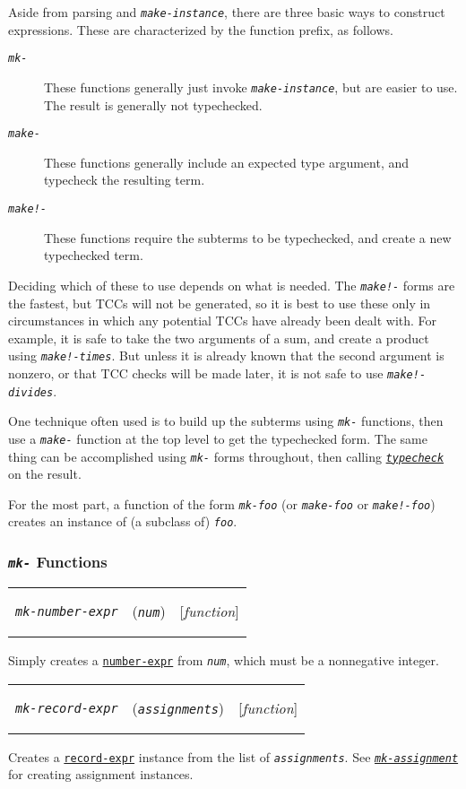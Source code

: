\documentclass[12pt]{book}
\makeatletter
\newenvironment{function}[3]%
{\par\noindent\begin{boxedminipage}{\textwidth}%
 \par\noindent\begin{tabularx}{\linewidth}{l>{\raggedright}Xr}%
 \functionhtgt{#1}&(\texttt{\textit{#2}})&[\emph{#3}]%
 \end{tabularx}\par\flushright\begin{minipage}{.97\textwidth}}
{\end{minipage}\end{boxedminipage}}
\newcommand{\functionarg}[1]{\texttt{\textit{#1}}}
\newcommand{\functionnm}[1]{\texttt{\textit{#1}}}
\newcommand{\functionhln}[1]{\hyperlink{#1}{\functionnm{#1}}}
\newcommand{\functionhtgt}[1]{\hypertarget{#1}{\functionnm{#1}}\index{#1@\functionnm{#1}|underline}}
\newenvironment{lispfunction}[2]%
{\begin{function}{#1}{#2}{function}}{\end{function}}
\newcommand{\classnm}[1]{\texttt{\textup{#1}}}
\newcommand{\classhln}[1]{\hyperlink{#1}{\classnm{#1}}}
\makeatother
\begin{document}
Aside from parsing and \functionnm{make-instance}, there are three basic
ways to construct expressions.  These are characterized by the function
prefix, as follows.
\begin{description}
\item[\functionnm{mk-}] These functions generally just invoke
\functionnm{make-instance}, but are easier to use.  The result is generally
not typechecked.

\item[\functionnm{make-}] These functions generally include an expected type
argument, and typecheck the resulting term.

\item[\functionnm{make!-}] These functions require the subterms to be
typechecked, and create a new typechecked term.
\end{description}

Deciding which of these to use depends on what is needed.  The
\functionnm{make!-} forms are the fastest, but TCCs will not be generated,
so it is best to use these only in circumstances in which any potential
TCCs have already been dealt with.  For example, it is safe to take the
two arguments of a sum, and create a product using
\functionnm{make!-times}.  But unless it is already known that the second
argument is nonzero, or that TCC checks will be made later, it is not safe
to use \functionnm{make!-divides}.

One technique often used is to build up the subterms using
\functionnm{mk-} functions, then use a \functionnm{make-} function at the
top level to get the typechecked form.  The same thing can be accomplished
using \functionnm{mk-} forms throughout, then calling
\functionhln{typecheck} on the result.

For the most part, a function of the form \functionnm{mk-foo} (or
\functionnm{make-foo} or \functionnm{make!-foo}) creates an instance of (a
subclass of) \texttt{\textit{foo}}.

\subsubsection*{\functionnm{mk-} Functions}

\begin{lispfunction}{mk-number-expr}{num}
Simply creates a \classhln{number-expr} from \functionarg{num}, which must
be a nonnegative integer.
\end{lispfunction}

\begin{lispfunction}{mk-record-expr}{assignments}
Creates a \classhln{record-expr} instance from the list of
\functionarg{assignments}.  See \functionhln{mk-assignment} for
creating assignment instances.
\end{lispfunction}
\end{document}
